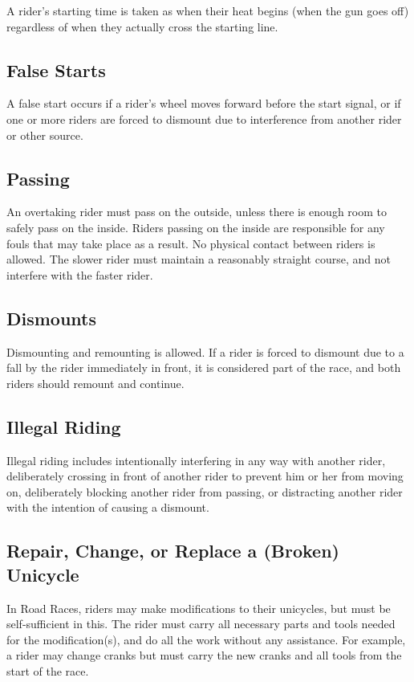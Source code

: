 A rider's starting time is taken as when their heat begins (when the gun goes off) regardless of when they actually cross the starting line.

\subsection{False Starts}

A false start occurs if a rider's wheel moves forward before the start signal, or if one or more riders are forced to dismount due to interference from another rider or other source.

\subsection{Passing}

An overtaking rider must pass on the outside, unless there is enough room to safely pass on the inside.
Riders passing on the inside are responsible for any fouls that may take place as a result.
No physical contact between riders is allowed.
The slower rider must maintain a reasonably straight course, and not interfere with the faster rider.

\subsection{Dismounts}

Dismounting and remounting is allowed. 
If a rider is forced to dismount due to a fall by the rider immediately in front, it is considered part of the race, and both riders should remount and continue.

\subsection{Illegal Riding}

Illegal riding includes intentionally interfering in any way with another rider, deliberately crossing in front of another rider to prevent him or her from moving on, deliberately blocking another rider from passing, or distracting another rider with the intention of causing a dismount.

\subsection{Repair, Change, or Replace a (Broken) Unicycle}
In Road Races, riders may make modifications to their unicycles, but must be self-sufficient in this.
The rider must carry all necessary parts and tools needed for the modification(s), and do all the work without any assistance.
For example, a rider may change cranks but must carry the new cranks and all tools from the start of the race.

